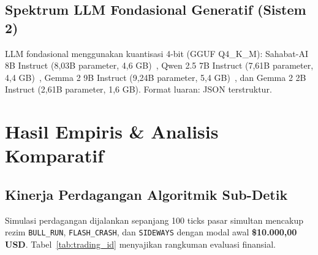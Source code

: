 \documentclass[journal,compsoc]{IEEEtran}
\begin{document}
\subsection{Spektrum LLM Fondasional Generatif (Sistem 2)}
LLM fondasional menggunakan kuantisasi 4-bit (GGUF Q4\_K\_M): Sahabat-AI 8B Instruct (8,03B parameter, 4,6 GB)~\cite{sahabatai2024}, Qwen 2.5 7B Instruct (7,61B parameter, 4,4 GB)~\cite{qwen2024}, Gemma 2 9B Instruct (9,24B parameter, 5,4 GB)~\cite{gemma2024}, dan Gemma 2 2B Instruct (2,61B parameter, 1,6 GB). Format luaran: JSON terstruktur.

\section{Hasil Empiris \& Analisis Komparatif}

\subsection{Kinerja Perdagangan Algoritmik Sub-Detik}
Simulasi perdagangan dijalankan sepanjang 100 ticks pasar simultan mencakup rezim \texttt{BULL\_RUN}, \texttt{FLASH\_CRASH}, dan \texttt{SIDEWAYS} dengan modal awal \textbf{\$10.000,00 USD}. Tabel~\ref{tab:trading_id} menyajikan rangkuman evaluasi finansial.
\end{document}

